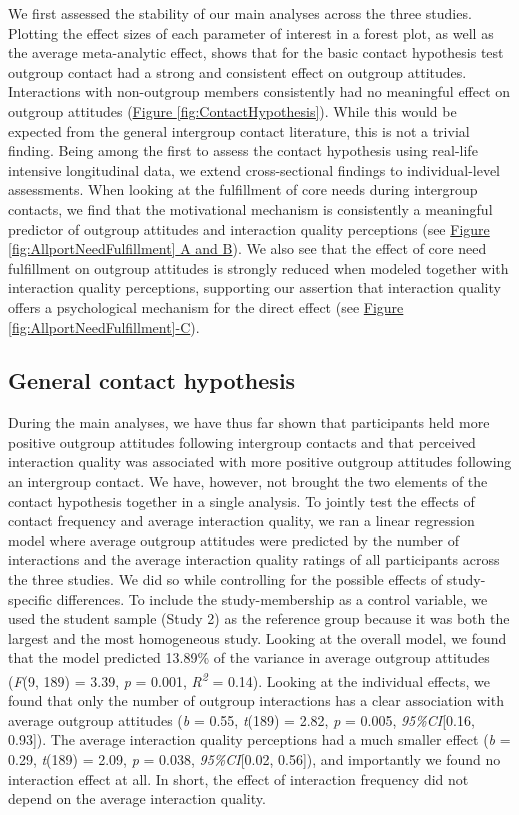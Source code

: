\documentclass[man, 12pt, a4paper, mask]{apa7}
\theoremstyle{break}
\theoremstyle{plain}
\newcommand{\fgrref}[2][]{\hyperref[#2]{Figure \ref*{#2}#1}}
\begin{document}
We first assessed the stability of our main analyses across the three
studies. Plotting the effect sizes of each parameter of interest in a
forest plot, as well as the average meta-analytic effect, shows that for
the basic contact hypothesis test outgroup contact had a strong and
consistent effect on outgroup attitudes. Interactions with non-outgroup
members consistently had no meaningful effect on outgroup attitudes
(\fgrref{fig:ContactHypothesis}). While this would be expected from the
general intergroup contact literature, this is not a trivial finding.
Being among the first to assess the contact hypothesis using real-life
intensive longitudinal data, we extend cross-sectional findings to
individual-level assessments. When looking at the fulfillment of core
needs during intergroup contacts, we find that the motivational
mechanism is consistently a meaningful predictor of outgroup attitudes
and interaction quality perceptions (see
\fgrref[ A and B]{fig:AllportNeedFulfillment}). We also see that the
effect of core need fulfillment on outgroup attitudes is strongly
reduced when modeled together with interaction quality perceptions,
supporting our assertion that interaction quality offers a psychological
mechanism for the direct effect (see
\fgrref[-C]{fig:AllportNeedFulfillment}).

\subsection{General contact hypothesis}

During the main analyses, we have thus far shown that participants held
more positive outgroup attitudes following intergroup contacts and that
perceived interaction quality was associated with more positive outgroup
attitudes following an intergroup contact. We have, however, not brought
the two elements of the contact hypothesis together in a single
analysis. To jointly test the effects of contact frequency and average
interaction quality, we ran a linear regression model where average
outgroup attitudes were predicted by the number of interactions and the
average interaction quality ratings of all participants across the three
studies. We did so while controlling for the possible effects of
study-specific differences. To include the study-membership as a control
variable, we used the student sample (Study 2) as the reference group
because it was both the largest and the most homogeneous study. Looking
at the overall model, we found that the model predicted 13.89\% of the
variance in average outgroup attitudes (\textit{F}(9, 189) = 3.39,
\textit{p} = 0.001, \textit{R\textsuperscript{2}} = 0.14). Looking at
the individual effects, we found that only the number of outgroup
interactions has a clear association with average outgroup attitudes
(\textit{b} = 0.55, \textit{t}(189) = 2.82, \textit{p} = 0.005,
\textit{95\%CI}{[}0.16, 0.93{]}). The average interaction quality
perceptions had a much smaller effect (\textit{b} = 0.29,
\textit{t}(189) = 2.09, \textit{p} = 0.038, \textit{95\%CI}{[}0.02,
0.56{]}), and importantly we found no interaction effect at all. In
short, the effect of interaction frequency did not depend on the average
interaction quality.
\end{document}

